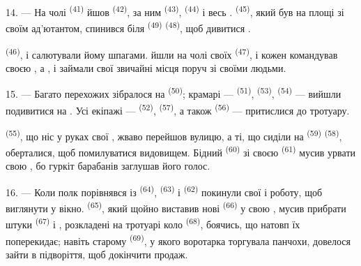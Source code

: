\VUsaut{3.0mm}

14. --- На чолі  \textsuperscript{(41)} йшов 
\textsuperscript{(42)}, за ним  \textsuperscript{(43)},
 \textsuperscript{(44)} і весь .
 \textsuperscript{(45)}, який був на площі зі своїм ад'ютантом,
спинився біля  \textsuperscript{(49)} 
\textsuperscript{(48)}, щоб дивитися .

 \textsuperscript{(46)},  і
 салютували йому шпагами.  йшли на чолі
своїх  \textsuperscript{(47)}, і кожен 
командував своєю , а ,  і
 займали свої звичайні місця поруч зі своїми людьми.

15. --- Багато перехожих зібралося на 
\textsuperscript{(50)}; крамарі ---  \textsuperscript{(51)},
 \textsuperscript{(53)},  \textsuperscript{(54)} ---
вийшли подивитися на . Усі екіпажі ---  \textsuperscript{(52)}, 
\textsuperscript{(57)}, а також  \textsuperscript{(56)}
--- притислися до тротуару.

\VUsaut{3.0mm}

 \textsuperscript{(55)}, що ніс у руках свої , жваво перейшов вулицю, а ті, що сиділи на 
\textsuperscript{(59)}  \textsuperscript{(58)}, оберталися, щоб
помилуватися видовищем. Бідний  \textsuperscript{(60)} зі
своєю  \textsuperscript{(61)} мусив урвати свою
, бо гуркіт барабанів заглушав його голос.

16. --- Коли полк порівнявся із 
\textsuperscript{(64)},  \textsuperscript{(63)} і 
\textsuperscript{(62)} покинули свої  і роботу, щоб
виглянути у вікно.  \textsuperscript{(65)}, який щойно виставив
нові  \textsuperscript{(66)} у свою , мусив
прибрати штуки  \textsuperscript{(67)} і ,
розкладені на тротуарі коло  \textsuperscript{(68)}, боячись,
що натовп їх поперекидає; навіть старому 
\textsuperscript{(69)}, у якого воротарка торгувала панчохи, довелося зайти в
підворіття, щоб докінчити продаж.

